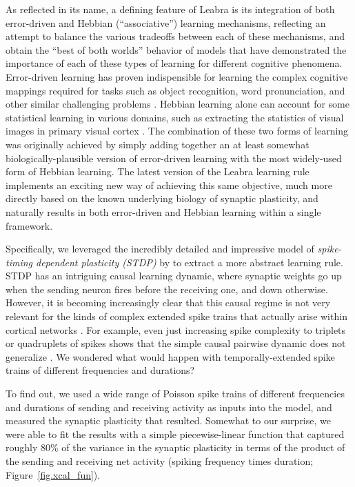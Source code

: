 \documentclass[11pt,twoside]{article}
\begin{document}
As reflected in its name, a defining feature of Leabra is its
integration of both error-driven and Hebbian (``associative'')
learning mechanisms, reflecting an attempt to balance the various
tradeoffs between each of these mechanisms, and obtain the ``best of
both worlds'' behavior of models that have demonstrated the importance
of each of these types of learning for different cognitive phenomena.
Error-driven learning has proven indispensible for learning the
complex cognitive mappings required for tasks such as object
recognition, word pronunciation, and other similar challenging
problems \cite{citesfmOReillyMunakata00??}.  Hebbian learning alone
can account for some statistical learning in various domains, such as
extracting the statistics of visual images in primary visual cortex
\cite{OlshausenField96,OlshausenField97}.  The combination of these
two forms of learning was originally achieved by simply adding
together an at least somewhat biologically-plausible version of
error-driven learning \cite{OReilly96} with the most widely-used form
of Hebbian learning.  The latest version of the Leabra learning rule
implements an exciting new way of achieving this same objective, much
more directly based on the known underlying biology of synaptic
plasticity, and naturally results in both error-driven and Hebbian
learning within a single framework.

Specifically, we leveraged the incredibly detailed and impressive
model of {\em spike-timing dependent plasticity (STDP)} by
 to extract a more abstract learning
rule.  STDP has an intriguing causal learning dynamic, where synaptic
weights go up when the sending neuron fires before the receiving one,
and down otherwise.  However, it is becoming increasingly clear that
this causal regime is not very relevant for the kinds of complex
extended spike trains that actually arise within cortical networks
\cite{FroemkeDan02,ShouvalWangWittenberg10,WangGerkinNauenEtAl05,stdpsucks}.
For example, even just increasing spike complexity to triplets or
quadruplets of spikes shows that the simple causal pairwise dynamic
does not generalize \cite{FroemkeDan02,WangGerkinNauenEtAl05}.  We
wondered what would happen with temporally-extended spike trains of
different frequencies and durations?

To find out, we used a wide range of Poisson spike trains of different
frequencies and durations of sending and receiving activity as inputs
into the  model, and measured the
synaptic plasticity that resulted.  Somewhat to our surprise, we were
able to fit the results with a simple piecewise-linear function that
captured roughly 80\% of the variance in the synaptic plasticity in
terms of the product of the sending and receiving net activity
(spiking frequency times duration; Figure~\ref{fig.xcal_fun}).
\end{document}

